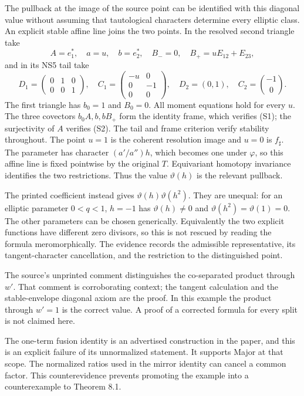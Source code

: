 \documentclass[10pt]{article}
\begin{document}
The pullback at the image of the source point can be identified with this diagonal value without assuming that tautological characters determine every elliptic class. An explicit stable affine line joins the two points. In the resolved second triangle take \[A=e_1^*,\quad a=u,\quad b=e_2^*,\quad
 B_-=0,\quad B_+=uE_{12}+E_{23},\] and in its NS5 tail take \[D_1=\begin{pmatrix}0&1&0\\0&0&1\end{pmatrix},\quad
 C_1=\begin{pmatrix}-u&0\\0&-1\\0&0\end{pmatrix},
 \quad D_2=(0,1),\quad C_2=\binom{-1}{0}.\] The first triangle has \(b_0=1\) and \(B_0=0\). All moment equations hold for every \(u\). The three covectors \(b_0A,b,bB_+\) form the identity frame, which verifies (S1); the surjectivity of \(A\) verifies (S2). The tail and frame criterion verify stability throughout. The point \(u=1\) is the coherent resolution image and \(u=0\) is \(f_\sharp\). The parameter has character \((a'/a'')h\), which becomes one under \(\varphi\), so this affine line is fixed pointwise by the original \(T\). Equivariant homotopy invariance identifies the two restrictions. Thus the value \(\vartheta(h)\) is the relevant pullback.\par
The printed coefficient instead gives \(\vartheta(h)\vartheta(h^2)\). They are unequal: for an elliptic parameter \(0<q<1\), \(h=-1\) has \(\vartheta(h)\ne0\) and \(\vartheta(h^2)=\vartheta(1)=0\). The other parameters can be chosen generically. Equivalently the two explicit functions have different zero divisors, so this is not rescued by reading the formula meromorphically. The evidence records the admissible representative, its tangent-character cancellation, and the restriction to the distinguished point.\par
The source’s unprinted comment distinguishes the co-separated product through \(w'\). That comment is corroborating context; the tangent calculation and the stable-envelope diagonal axiom are the proof. In this example the product through \(w'=1\) is the correct value. A proof of a corrected formula for every split is not claimed here.\par
The one-term fusion identity is an advertised construction in the paper, and this is an explicit failure of its unnormalized statement. It supports Major at that scope. The normalized ratios used in the mirror identity can cancel a common factor. This counterevidence prevents promoting the example into a counterexample to Theorem 8.1.\par
\end{document}
